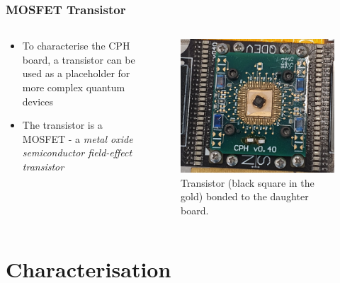 \documentclass{beamer}
\begin{document}
\begin{frame}
    \frametitle{MOSFET Transistor}

    \begin{columns}
        \begin{column}{0.5\textwidth}
            \begin{itemize}
                \item To characterise the CPH board, a transistor can be used as a placeholder for more complex quantum devices
                \item The transistor is a MOSFET - a \emph{metal oxide semiconductor field-effect transistor}
            \end{itemize}
        \end{column}
        \begin{column}{0.5\textwidth}
            \begin{figure}
                \includegraphics[width=\textwidth]{cphboardtrans.jpg}
                \caption{Transistor (black square in the gold) bonded to the daughter board.}
                \label{fig:cphboardtrans}
            \end{figure}
        \end{column}
    \end{columns}

\end{frame}

\section{Characterisation}
\end{document}
